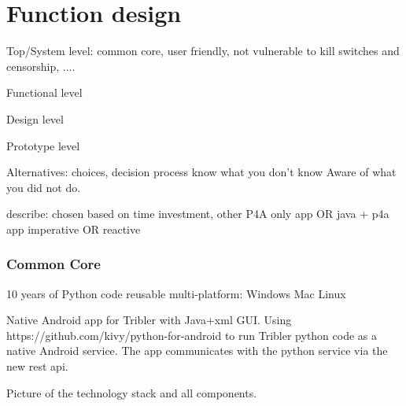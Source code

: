 \section{Function design}

Top/System level: common core, user friendly, not vulnerable to kill switches and censorship, ....


Functional level

Design level

Prototype level



Alternatives: choices, decision process
know what you don't know
Aware of what you did not do.


describe: chosen based on time investment, other 
P4A only app OR java + p4a app
imperative OR reactive



\subsubsection{Common Core}
10 years of Python code 
reusable multi-platform: Windows Mac Linux


Native Android app for Tribler with Java+xml GUI.
Using https://github.com/kivy/python-for-android to run Tribler python code as a native Android service.
The app communicates with the python service via the new rest api.

Picture of the technology stack and all components.
